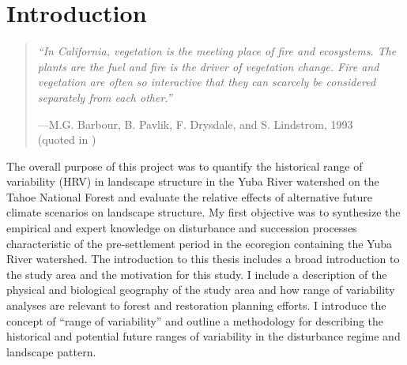 
\chapter{Introduction} %
\label{CH1}

\newcommand{\source}[1]{%
  \nobreak\parbox[t]{\linewidth}{\raggedleft #1}%
}%
\begin{quote}
\emph{“In California, vegetation is the meeting place of fire and ecosystems. The plants are the fuel and fire is the driver of vegetation change. Fire and vegetation are often so interactive that they can scarcely be considered separately from each other.”} \\
\medskip
  \source{%
    ---M.G. Barbour, B. Pavlik, F. Drysdale, and S. Lindstrom, 1993 \\ (quoted in \citet{Sugihara2006}) \\
  }
\end{quote}




The overall purpose of this project was to quantify the historical range of variability (HRV) in landscape structure in the Yuba River watershed on the Tahoe National Forest and evaluate the relative effects of alternative future climate scenarios on landscape structure. My first objective was to synthesize the empirical and expert knowledge on disturbance and succession processes characteristic of the pre-settlement period in the ecoregion containing the Yuba River watershed. The introduction to this thesis includes a broad introduction to the study area and the motivation for this study. I include a description of the physical and biological geography of the study area and how range of variability analyses are relevant to forest and restoration planning efforts. I introduce the concept of ``range of variability'' and outline a methodology for describing the historical and potential future ranges of variability in the disturbance regime and landscape pattern.


